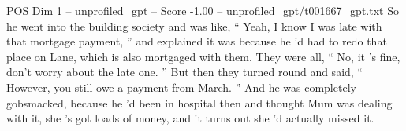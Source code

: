 \begin{textsample}{POS Dim 1 – unprofiled\_gpt – Score -1.00 – unprofiled\_gpt/t001667\_gpt.txt}  \label{ex:f1_pos_029}
So he went into the building society and was like, “ Yeah, I know I was late with that mortgage payment, ” and explained it was because he ’d had to redo that place on Lane, which is also mortgaged with them.
They were all, “ No, it ’s fine, don't worry about the late one. ” But then they turned round and said, “ However, you still owe a payment from March. ” And he was completely gobsmacked, because he ’d been in hospital then and thought Mum was dealing with it, she ’s got loads of money, and it turns out she ’d actually missed it.

\end{textsample}
